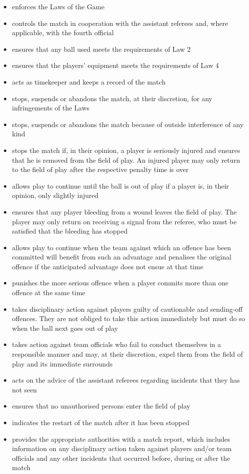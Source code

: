 \begin{itemize}
\item enforces the Laws of the Game
\item controls the match in cooperation with the assistant referees and, where applicable, with the fourth official
\item ensures that any ball used meets the requirements of Law 2 
\item ensures that the players' equipment meets the requirements of Law 4
\item acts as timekeeper and keeps a record of the match
\item stops, suspends or abandons the match, at their discretion, for any infringements of the Laws
\item stops, suspends or abandons the match because of outside interference of any kind
\item stops the match if, in their opinion, a player is seriously injured and ensures that he is removed from the field of play. An injured player may only return to the field of play after the respective penalty time is over 
\item allows play to continue until the ball is out of play if a player is, in their opinion, only slightly injured 
\item ensures that any player bleeding from a wound leaves the field of play. The player may only return on receiving a signal from the referee, who must be satisfied that the bleeding has stopped
\item allows play to continue when the team against which an offence has been committed will benefit from such an advantage and penalises the original offence if the anticipated advantage does not ensue at that time
\item punishes the more serious offence when a player commits more than one offence at the same time
\item takes disciplinary action against players guilty of cautionable and sending-off offences. They are not obliged to take this action immediately but must do so when the ball next goes out of play 
\item takes action against team officials who fail to conduct themselves in a responsible manner and may, at their discretion, expel them from the field of play and its immediate surrounds 
\item acts on the advice of the assistant referees regarding incidents that they has not seen 
\item ensures that no unauthorised persons enter the field of play 
\item indicates the restart of the match after it has been stopped 
\item provides the appropriate authorities with a match report, which includes information on any disciplinary action taken against players and/or team officials and any other incidents that occurred before, during or after
the match 
\end{itemize}

